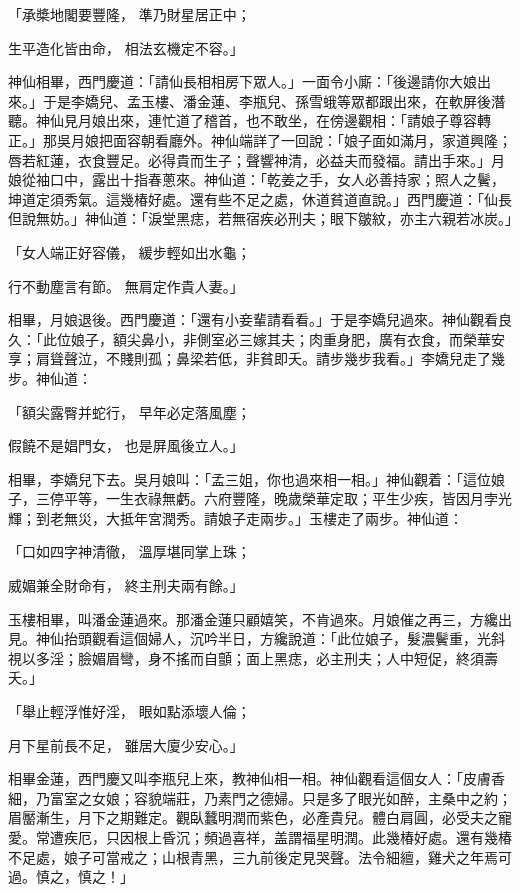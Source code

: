 \begin{showcontents}{}
「承槳地閣要豐隆，  準乃財星居正中；

生平造化皆由命，  相法玄機定不容。」

神仙相畢，西門慶道：「請仙長相相房下眾人。」一面令小廝：「後邊請你大娘出來。」于是李嬌兒、孟玉樓、潘金蓮、李瓶兒、孫雪蛾等眾都跟出來，在軟屏後潛聽。神仙見月娘出來，連忙道了稽首，也不敢坐，在傍邊觀相：「請娘子尊容轉正。」那吳月娘把面容朝看廳外。神仙端詳了一回說：「娘子面如滿月，家道興隆；唇若紅蓮，衣食豐足。必得貴而生子；聲響神清，必益夫而發福。請出手來。」月娘從袖口中，露出十指春蔥來。神仙道：「乾姜之手，女人必善持家；照人之鬢，坤道定須秀氣。這幾椿好處。還有些不足之處，休道貧道直說。」西門慶道：「仙長但說無妨。」神仙道：「淚堂黑痣，若無宿疾必刑夫；眼下皺紋，亦主六親若冰炭。」

「女人端正好容儀，  緩步輕如出水龜；

行不動塵言有節。  無肩定作貴人妻。」

相畢，月娘退後。西門慶道：「還有小妾輩請看看。」于是李嬌兒過來。神仙觀看良久：「此位娘子，額尖鼻小，非側室必三嫁其夫；肉重身肥，廣有衣食，而榮華安享；肩聳聲泣，不賤則孤；鼻梁若低，非貧即夭。請步幾步我看。」李嬌兒走了幾步。神仙道：

「額尖露臀并蛇行，  早年必定落風塵；

假饒不是娼門女，  也是屏風後立人。」

相畢，李嬌兒下去。吳月娘叫：「孟三姐，你也過來相一相。」神仙觀着：「這位娘子，三停平等，一生衣祿無虧。六府豐隆，晚歲榮華定取；平生少疾，皆因月孛光輝；到老無災，大抵年宮潤秀。請娘子走兩步。」玉樓走了兩步。神仙道：

「口如四字神清徹，  溫厚堪同掌上珠；

威媚兼全財命有，  終主刑夫兩有餘。」

玉樓相畢，叫潘金蓮過來。那潘金蓮只顧嬉笑，不肯過來。月娘催之再三，方纔出見。神仙抬頭觀看這個婦人，沉吟半日，方纔說道：「此位娘子，髮濃鬢重，光斜視以多淫；臉媚眉彎，身不搖而自顫；面上黑痣，必主刑夫；人中短促，終須壽夭。」

「舉止輕浮惟好淫，  眼如點添壞人倫；

月下星前長不足，  雖居大廈少安心。」

相畢金蓮，西門慶又叫李瓶兒上來，教神仙相一相。神仙觀看這個女人：「皮膚香細，乃富室之女娘；容貌端莊，乃素門之德婦。只是多了眼光如醉，主桑中之約；眉靨漸生，月下之期難定。觀臥蠶明潤而紫色，必產貴兒。體白肩圓，必受夫之寵愛。常遭疾厄，只因根上昏沉；頻過喜祥，盖謂福星明潤。此幾椿好處。還有幾椿不足處，娘子可當戒之；山根青黑，三九前後定見哭聲。法令細繵，雞犬之年焉可過。慎之，慎之！」


\end{showcontents}

